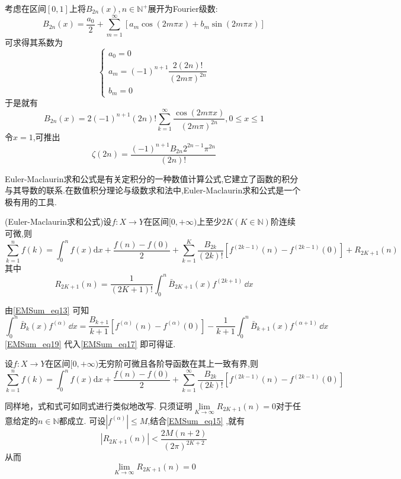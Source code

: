 考虑在区间$[0,1]$上将$B_{2n}(x),n\in{\mathbb N^{+}}$展开为Fourier级数:
\[
    B_{2n}(x)=\frac{a_{0}}{2}+\sum_{m=1}^{\infty}[a_{m}\cos(2m\pi x)+b_{m}\sin(2m\pi x)]
\]
可求得其系数为
\begin{equation}
    \begin{cases}
        a_{0}=0\\
        a_{m}=(-1)^{n+1}\dfrac{2(2n)!}{(2m\pi)^{2n}}\\
        b_{m}=0
    \end{cases}
\end{equation}
于是就有
\begin{equation}\label{EMSum_eq15}
    B_{2n}(x)=2(-1)^{n+1}(2n)!\sum_{k=1}^{\infty}\frac{\cos(2m\pi x)}{(2m\pi)^{2n}},0\leqslant x\leqslant1
\end{equation}
令$x=1$,可推出
\begin{equation}
    \zeta(2n)=\frac{(-1)^{n+1}B_{2n}2^{2n-1}\pi^{2n}}{(2n)!}
\end{equation}

Euler-Maclaurin求和公式是有关定积分的一种数值计算公式,它建立了函数的积分与其导数的联系.在数值积分理论与级数求和法中,Euler-Maclaurin求和公式是一个极有用的工具.

\begin{theorem}{}
    (Euler-Maclaurin求和公式)设$f:X\to Y$在区间$[0,+\infty)$上至少$2K(K\in{\mathbb N})$阶连续可微,则
    \begin{equation}\label{EMSum_eq17}
        \sum_{k=1}^{n}f(k)=\int_{0}^{n}f(x)\mathrm{d}x
        +\frac{f(n)-f(0)}{2}+\sum_{k=1}^{K}\frac{B_{2k}}{(2k)!}[f^{(2k-1)}(n)-f^{(2k-1)}(0)]
        +R_{2K+1}(n)
    \end{equation}
    其中
    \begin{equation}
        R_{2K+1}(n)=\frac{1}{(2K+1)!}\int_{0}^{n}\bar{B}_{2K+1}(x)f^{(2k+1)}\,\dd x
    \end{equation}
\end{theorem}
由\autoref{EMSum_eq13} 可知
    \begin{equation}\label{EMSum_eq19}
        \int_{0}^{n}\bar{B}_{k}(x)f^{(\alpha)}\,\dd x
        =\frac{B_{k+1}}{k+1}[f^{(\alpha)}(n)-f^{(\alpha)}(0)]
        -\frac{1}{k+1}\int_{0}^{n}\bar{B}_{k+1}(x)f^{(\alpha+1)}\,\dd x
    \end{equation}
\autoref{EMSum_eq19} 代入\autoref{EMSum_eq17} 即可得证.

\begin{theorem}{}
    设$f:X\to Y$在区间$[0,+\infty)$无穷阶可微且各阶导函数在其上一致有界,则
    \begin{equation}
        \sum_{k=1}^{n}f(k)=\int_{0}^{n}f(x)\mathrm{d}x+\frac{f(n)-f(0)}{2}
        +\sum_{k=1}^{\infty}\frac{B_{2k}}{(2k)!}[f^{(2k-1)}(n)-f^{(2k-1)}(0)]
    \end{equation}
\end{theorem}
同样地，式和式可如同式进行类似地改写.
只须证明$\lim\limits_{K\to\infty}R_{2K+1}(n)=0$对于任意给定的$n\in{\mathbb N}$都成立.
可设$|f^{(\alpha)}|\leqslant M$,结合\autoref{EMSum_eq15} ,就有
\begin{equation}
        |R_{2K+1}(n)|<\frac{2M(n+2)}{(2\pi)^{2K+2}}
\end{equation}
从而
\[
    \lim\limits_{K\to\infty}R_{2K+1}(n)=0	
\]	


